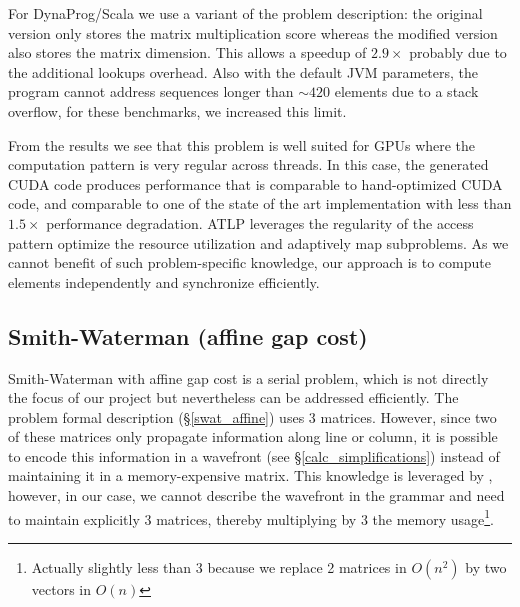 For DynaProg/Scala we use a variant of the problem description: the original version only stores the matrix multiplication score whereas the modified version also stores the matrix dimension. This allows a speedup of $2.9\times$ probably due to the additional lookups overhead. Also with the default JVM parameters, the program cannot address sequences longer than $\sim 420$ elements due to a stack overflow, for these benchmarks, we increased this limit.

From the results we see that this problem is well suited for GPUs where the computation pattern is very regular across threads. In this case, the generated CUDA code produces performance that is comparable to hand-optimized CUDA code, and comparable to one of the state of the art implementation with less than $1.5\times$ performance degradation. ATLP leverages the regularity of the access pattern optimize the resource utilization and adaptively map subproblems\cite{gpu_atlp}. As we cannot benefit of such problem-specific knowledge, our approach is to compute elements independently and synchronize efficiently.

\subsection{Smith-Waterman (affine gap cost)}
Smith-Waterman with affine gap cost is a serial problem, which is not directly the focus of our project but nevertheless can be addressed efficiently. The problem formal description (\S\ref{swat_affine}) uses 3 matrices. However, since two of these matrices only propagate information along line or column, it is possible to encode this information in a wavefront (see \S\ref{calc_simplifications}) instead of maintaining it in a memory-expensive matrix. This knowledge is leveraged by \cite{ATLP}, however, in our case, we cannot describe the wavefront in the grammar and need to maintain explicitly 3 matrices, thereby multiplying by 3 the memory usage\footnote{Actually slightly less than 3 because we replace 2 matrices in $O(n^2)$ by two vectors in $O(n)$}.


